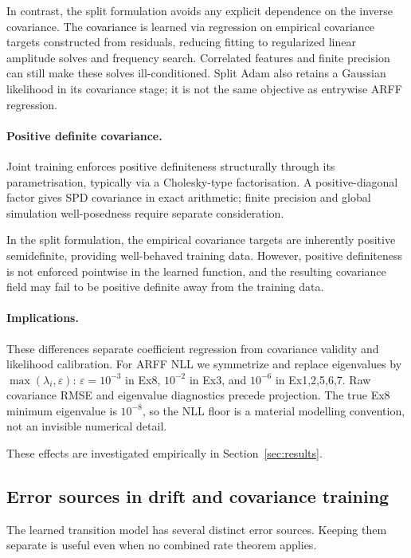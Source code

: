 \documentclass{article}
\begin{document}
In contrast, the split formulation avoids any explicit dependence on the inverse covariance. The \textcolor{black}{covariance}  is learned via regression on empirical covariance targets constructed from residuals, reducing fitting to regularized linear amplitude solves and frequency search. Correlated features and finite precision can still make these solves ill-conditioned. Split Adam also retains a Gaussian likelihood in its covariance stage; it is not the same objective as entrywise ARFF regression.

\paragraph{Positive definite covariance.}
Joint training enforces positive definiteness structurally through its parametrisation, typically via a Cholesky-type factorisation. A positive-diagonal factor gives SPD covariance in exact arithmetic; finite precision and global simulation well-posedness require separate consideration.

In the split formulation, the empirical covariance targets are inherently positive semidefinite, providing well-behaved training data. However, positive definiteness is not enforced pointwise in the learned function, and the resulting covariance field may fail to be positive definite away from the training data.

\paragraph{Implications.}
These differences separate coefficient regression from covariance validity and likelihood calibration. For ARFF NLL we symmetrize and replace eigenvalues by $\max(\lambda_i,\varepsilon)$: $\varepsilon=10^{-3}$ in Ex8, $10^{-2}$ in Ex3, and $10^{-6}$ in Ex1,2,5,6,7. Raw covariance RMSE and eigenvalue diagnostics precede projection. The true Ex8 minimum eigenvalue is $10^{-8}$, so the NLL floor is a material modelling convention, not an invisible numerical detail.

These effects are investigated empirically in Section~\ref{sec:results}.


\subsection{Error sources in drift and covariance training}\label{sec:error_decomposition}
The learned transition model has several distinct error sources. Keeping them separate is useful even when no combined rate theorem applies.
\end{document}
